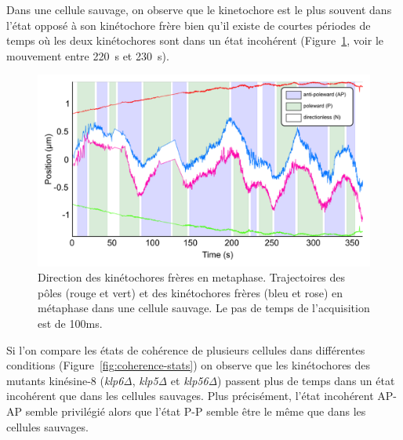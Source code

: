 \documentclass[12pt,a4paper,twoside,openright]{book}
\begin{document}
Dans une cellule sauvage, on observe que le kinetochore est le plus
souvent dans l'état opposé à son kinétochore frère bien qu'il existe de
courtes périodes de temps où les deux kinétochores sont dans un état
incohérent (Figure~\ref{fig:coherence_kymo}, voir le mouvement entre
220~s et 230~s).

\begin{figure}[htbp]
\centering
\includegraphics{figures/results/imaging/coherence_kymo.png}
\caption[Direction des kinétochores frères en metaphase.]{\label{fig:coherence_kymo}Direction
des kinétochores frères en metaphase. Trajectoires des pôles (rouge et
vert) et des kinétochores frères (bleu et rose) en métaphase dans une
cellule sauvage. Le pas de temps de l'acquisition est de 100ms.}
\end{figure}

Si l'on compare les états de cohérence de plusieurs cellules dans
différentes conditions (Figure~\ref{fig:coherence-stats}) on observe que
les kinétochores des mutants kinésine-8 (\emph{klp6Δ}, \emph{klp5Δ} et
\emph{klp56Δ}) passent plus de temps dans un état incohérent que dans
les cellules sauvages. Plus précisément, l'état incohérent AP-AP semble
privilégié alors que l'état P-P semble être le même que dans les
cellules sauvages.
\end{document}
